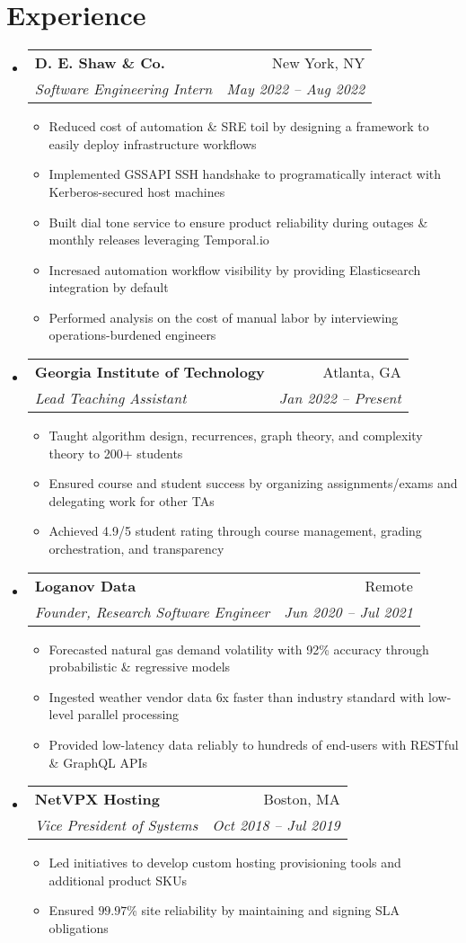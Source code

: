 \documentclass[a4paper,11pt]{extarticle}
\makeatletter
\newcommand{\resumeItem}[1]{
	\item\small{
		#1 \vspace{-2pt}
	}
}
\newcommand{\resumeSubheading}[4]{
	\vspace{-1pt}\item
		\begin{tabular*}{1\linewidth}{l@{\extracolsep{\fill}}r}
			\textbf{#1} & #2 \\
			\textit{#3} & \textit{#4} \\
		\end{tabular*}\vspace{-3pt}
}
\newcommand{\resumeSubHeadingListStart}{
    \begin{itemize}[leftmargin=0.15in,label={}]}
\newcommand{\resumeSubHeadingListEnd}{\end{itemize}}
\newcommand{\resumeItemListStart}{\begin{itemize}\vspace{-3pt}}
\newcommand{\resumeItemListEnd}{\end{itemize}\vspace{-3pt}}
\makeatother
\begin{document}
\section{Experience}
	\resumeSubHeadingListStart
        \resumeSubheading
            {D. E. Shaw \& Co.}
            {New York, NY}
            {Software Engineering Intern}
            {May 2022 -- Aug 2022}
		\resumeItemListStart
            \resumeItem{Reduced cost of automation \& SRE toil by
                designing a framework to easily deploy infrastructure
                workflows}
            \resumeItem{Implemented GSSAPI SSH handshake to programatically
                interact with Kerberos-secured host machines}
            \resumeItem{Built dial tone service to ensure product reliability during
            outages \& monthly releases leveraging Temporal.io}
            \resumeItem{Incresaed automation workflow visibility by providing
                Elasticsearch integration by default}
            \resumeItem{Performed analysis on the cost of manual labor by interviewing
                operations-burdened engineers}
		\resumeItemListEnd
        \resumeSubheading
            {Georgia Institute of Technology}
            {Atlanta, GA}
            {Lead Teaching Assistant}
            {Jan 2022 -- Present}
		\resumeItemListStart
			\resumeItem{Taught algorithm design, recurrences, graph
            theory, and complexity theory to 200+ students}
            \resumeItem{Ensured course and student success by organizing 
                assignments/exams and delegating work for other TAs}
            \resumeItem{Achieved 4.9/5 student rating through course management,
                grading orchestration, and transparency}
		\resumeItemListEnd
		\resumeSubheading
            {Loganov Data}
            {Remote}
		    {Founder, Research Software Engineer}
            {Jun 2020 -- Jul 2021}
		\resumeItemListStart
			\resumeItem{Forecasted natural gas demand volatility with 92\%
                accuracy through probabilistic \& regressive models}
			\resumeItem{Ingested weather vendor data 6x faster than industry
				standard with low-level parallel processing}
			\resumeItem{Provided low-latency data reliably to hundreds of
				end-users with RESTful \& GraphQL APIs}
		\resumeItemListEnd
		\resumeSubheading
            {NetVPX Hosting}
            {Boston, MA}
		    {Vice President of Systems}
            {Oct 2018 -- Jul 2019}
		\resumeItemListStart
			\resumeItem{Led initiatives to develop custom hosting provisioning
				tools and additional product SKUs}
			\resumeItem{Ensured $99.97$\% site reliability by maintaining
				and signing SLA obligations}
		\resumeItemListEnd
	\resumeSubHeadingListEnd
\end{document}
